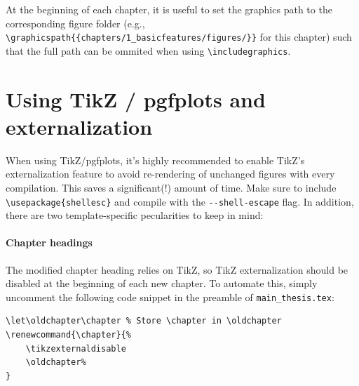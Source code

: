 At the beginning of each chapter, it is useful to set the graphics path to the corresponding figure folder (e.g., \verb|\graphicspath{{chapters/1_basicfeatures/figures/}}| for this chapter) such that the full path can be ommited when using \verb|\includegraphics|.

\section{Using TikZ / pgfplots and externalization}
When using TikZ/pgfplots, it's highly recommended to enable TikZ's externalization feature to avoid re-rendering of unchanged figures with every compilation. This saves a significant(!) amount of time.  
Make sure to include \verb|\usepackage{shellesc}| and compile with the \verb|--shell-escape| flag. In addition, there are two template-specific pecularities to keep in mind: 

\paragraph{Chapter headings} The modified chapter heading relies on TikZ, so TikZ externalization should be disabled at the beginning of each new chapter. To automate this, simply uncomment the following code snippet in the preamble of \verb|main_thesis.tex|:
\begin{lstlisting}
\let\oldchapter\chapter	% Store \chapter in \oldchapter
\renewcommand{\chapter}{%
	\tikzexternaldisable
	\oldchapter%
}
\end{lstlisting}
